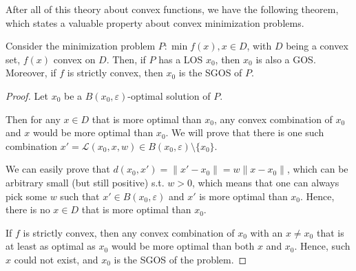 After all of this theory about convex functions, we have the following theorem,
which states a valuable property about convex minimization problems.

\begin{theorem}
  Consider the minimization problem \( P: \min f(x), x \in D \), with \( D \) being
  a convex set, \( f(x) \) convex on \( D \). Then, if \( P \) has a LOS \(
  x_{0} \), then \( x_{0} \) is also a GOS. Moreover, if \( f \) is strictly
  convex, then \( x_{0} \) is the SGOS of \( P \).
\end{theorem}

\begin{proof}
  Let \( x_{0} \) be a \( B(x_{0}, \varepsilon) \)-optimal solution of \( P \).

  Then for any \( x \in D \) that is more optimal than \( x_{0} \),
  any convex combination of \( x_{0} \) and \( x \) would be more optimal than
  \( x_{0} \). We will prove that there is one such combination \( x' =
  \mathcal{L}(x_{0}, x, w) \in B(x_{0}, \varepsilon) \setminus \{x_{0}\}   \).

  We can easily prove that \( d(x_{0}, x') = \|x'-x_{0}\| = w\|x-x_{0}\| \), which
  can be arbitrary small (but still positive)
  s.t. \( w > 0 \), which means that one can always pick
  some \( w \) such that \( x' \in B(x_{0}, \varepsilon) \) and \( x' \) is more
  optimal than \( x_{0} \). Hence, there is no \( x \in D \) that is more
  optimal than \( x_{0} \).

  If \( f \) is strictly convex, then any convex combination of \( x_{0} \) with
  an \( x \neq  x_{0}  \) that is at least as optimal as \( x_{0} \)
  would be more optimal than both \( x \) and \( x_{0} \). Hence, such \( x \)
  could not exist, and \( x_{0} \) is the SGOS of the problem.
\end{proof}



